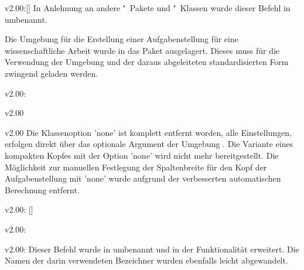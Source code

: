 \begin{Obsolete}{v2.00:}{[]}
\printobsoletelist%
%
In Anlehnung an andere "~Pakete und "~Klassen wurde 
dieser Befehl in  umbenannt.
\end{Obsolete}

\minisec{\taskname}
\begin{Bundle}{}
Die Umgebung für die Erstellung einer Aufgabenstellung für eine 
wissenschaftliche Arbeit wurde in das Paket  
ausgelagert. Dieses muss für die Verwendung der Umgebung  
und der daraus abgeleiteten standardisierten Form zwingend geladen werden.

\begin{Obsolete}{v2.00:}{}
\begin{Obsolete}{v2.00}{}
\begin{Obsolete}{v2.00}{}
\printobsoletelist%
%
Die Klassenoption 'none' ist komplett entfernt worden, alle 
Einstellungen, erfolgen direkt über das optionale Argument der Umgebung 
. Die Variante eines kompakten Kopfes mit der Option 
'none' wird nicht mehr bereitgestellt. Die Möglichkeit zur 
manuellen Festlegung der Spaltenbreite für den Kopf der Aufgabenstellung mit 
'none' wurde aufgrund der verbesserten automatischen 
Berechnung entfernt.
\end{Obsolete}
\end{Obsolete}
\end{Obsolete}

\begin{Obsolete}{v2.00:}{%
  []%
}
\begin{Obsolete}{v2.00:}{}
\begin{Obsolete}{v2.00:}{}
\printobsoletelist%
%
Dieser Befehl wurde in  umbenannt und in der Funktionalität 
erweitert. Die Namen der darin verwendeten Bezeichner wurden ebenfalls leicht 
abgewandelt.
\end{Obsolete}
\end{Obsolete}
\end{Obsolete}


\end{Bundle}
